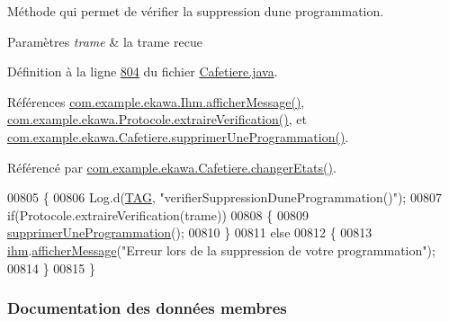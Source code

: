 Méthode qui permet de vérifier la suppression d\textquotesingle{}une programmation. 


\begin{DoxyParams}{Paramètres}
{\em trame} & la trame recue \\
\hline
\end{DoxyParams}


Définition à la ligne \hyperlink{_cafetiere_8java_source_l00804}{804} du fichier \hyperlink{_cafetiere_8java_source}{Cafetiere.\+java}.



Références \hyperlink{_ihm_8java_source_l00964}{com.\+example.\+ekawa.\+Ihm.\+afficher\+Message()}, \hyperlink{_protocole_8java_source_l00440}{com.\+example.\+ekawa.\+Protocole.\+extraire\+Verification()}, et \hyperlink{_cafetiere_8java_source_l00820}{com.\+example.\+ekawa.\+Cafetiere.\+supprimer\+Une\+Programmation()}.



Référencé par \hyperlink{_cafetiere_8java_source_l00463}{com.\+example.\+ekawa.\+Cafetiere.\+changer\+Etats()}.


\begin{DoxyCode}
00805     \{
00806         Log.d(\hyperlink{classcom_1_1example_1_1ekawa_1_1_cafetiere_aa0c1fd99a2508b06c462aea17034aa91}{TAG}, \textcolor{stringliteral}{"verifierSuppressionDuneProgrammation()"});
00807         \textcolor{keywordflow}{if}(Protocole.extraireVerification(trame))
00808         \{
00809             \hyperlink{classcom_1_1example_1_1ekawa_1_1_cafetiere_a40880363bf27354c1a7cb5df139fae53}{supprimerUneProgrammation}();
00810         \}
00811         \textcolor{keywordflow}{else}
00812         \{
00813             \hyperlink{classcom_1_1example_1_1ekawa_1_1_cafetiere_a7db4a63088834eda5f6a3e951611bf82}{ihm}.\hyperlink{classcom_1_1example_1_1ekawa_1_1_ihm_ab1ca33ad18d42540299e3a58a82f4d9a}{afficherMessage}(\textcolor{stringliteral}{"Erreur lors de la suppression de votre programmation"});
00814         \}
00815     \}
\end{DoxyCode}


\subsubsection{Documentation des données membres}
\mbox{\label{classcom_1_1example_1_1ekawa_1_1_cafetiere_a5a23a636fa5f2e5826458e700f453c16}} 
